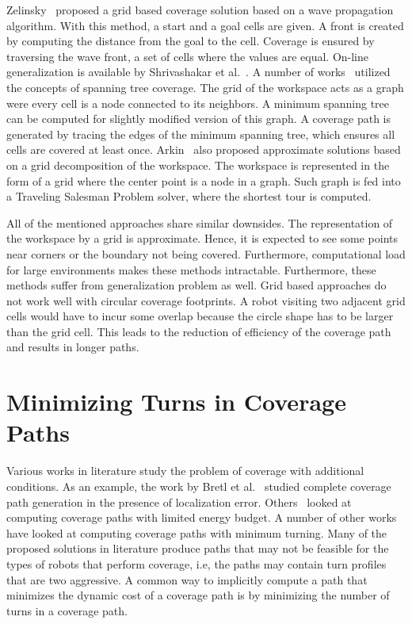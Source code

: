 \documentclass[../main.tex]{subfiles}
\begin{document}
Zelinsky~\cite{Zelinsky1993planning} proposed a grid based coverage solution based on a wave propagation algorithm. With this method, a start and a goal cells are given. A front is created by computing the distance from the goal to the cell. Coverage is ensured by traversing the wave front, a set of cells where the values are equal. On-line generalization is available by Shrivashakar et al.~\cite{shivashankar2011real}. A number of works~\cite{Gabriely2001spanning,gonzalez2003bsa,gonzalez2005bsa,choi2009online,Lee2011smooth} utilized the concepts of spanning tree coverage. The grid of the workspace acts as a graph were every cell is a node connected to its neighbors. A minimum spanning tree can be computed for slightly modified version of this graph. A coverage path is generated by tracing the edges of the minimum spanning tree, which ensures all cells are covered at least once. Arkin~\cite{arkin2000approximation} also proposed approximate solutions based on a grid decomposition of the workspace. The workspace is represented in the form of a grid where the center point is a node in a graph. Such graph is fed into a Traveling Salesman Problem solver, where the shortest tour is computed.

All of the mentioned approaches share similar downsides. The representation of the workspace by a grid is approximate. Hence, it is expected to see some points near corners or the boundary not being covered. Furthermore, computational load for large environments makes these methods intractable. Furthermore, these methods suffer from generalization problem as well. Grid based approaches do not work well with circular coverage footprints. A robot visiting two adjacent grid cells would have to incur some overlap because the circle shape has to be larger than the grid cell. This leads to the reduction of efficiency of the coverage path and results in longer paths.


\section{Minimizing Turns in Coverage Paths}
\label{section:minimizing_turns_in_coverage_paths}

Various works in literature study the problem of coverage with additional conditions. As an example, the work by Bretl et al.~\cite{bretl2013robust} studied complete coverage path generation in the presence of localization error. Others~\cite{shnaps2015line} looked at computing coverage paths with limited energy budget. A number of other works have looked at computing coverage paths with minimum turning. Many of the proposed solutions in literature produce paths that may not be feasible for the types of robots that perform coverage, i.e, the paths may contain turn profiles that are two aggressive. A common way to implicitly compute a path that minimizes the dynamic cost of a coverage path is by minimizing the number of turns in a coverage path. 
\end{document}
